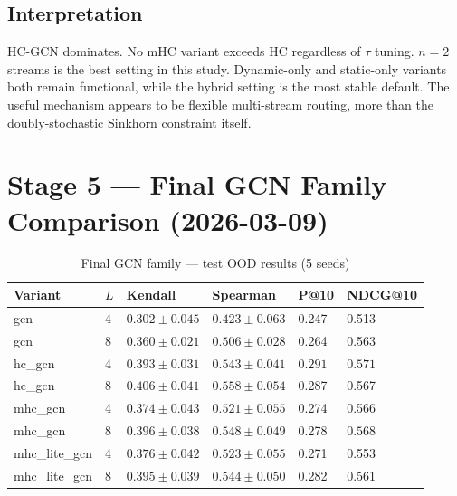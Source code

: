 \documentclass[11pt,a4paper]{article}
\begin{document}
\subsection{Interpretation}
HC-GCN dominates. No mHC variant exceeds HC regardless of $\tau$ tuning.
$n=2$ streams is the best setting in this study. Dynamic-only and
static-only variants both remain functional, while the hybrid setting
is the most stable default. The useful mechanism appears to be flexible
multi-stream routing, more than the doubly-stochastic Sinkhorn
constraint itself.

\section{Stage 5 --- Final GCN Family Comparison (2026-03-09)}

\begin{table}[h]
\centering
\caption{Final GCN family --- test OOD results (5 seeds)}
\begin{tabular}{L{3cm} C{0.8cm} R{2.2cm} R{2.2cm} R{2.2cm} R{2.2cm}}
\toprule
Variant & $L$ & Kendall & Spearman & P@10 & NDCG@10 \\
\midrule
gcn            & 4 & $0.302\pm0.045$ & $0.423\pm0.063$ & 0.247 & 0.513 \\
gcn            & 8 & $0.360\pm0.021$ & $0.506\pm0.028$ & 0.264 & 0.563 \\
\midrule
hc\_gcn        & 4 & $0.393\pm0.031$ & $0.543\pm0.041$ & $\mathbf{0.291}$ & $\mathbf{0.571}$ \\
hc\_gcn        & 8 & $\mathbf{0.406\pm0.041}$ & $\mathbf{0.558\pm0.054}$ & 0.287 & 0.567 \\
\midrule
mhc\_gcn       & 4 & $0.374\pm0.043$ & $0.521\pm0.055$ & 0.274 & 0.566 \\
mhc\_gcn       & 8 & $0.396\pm0.038$ & $0.548\pm0.049$ & 0.278 & $\mathbf{0.568}$ \\
\midrule
mhc\_lite\_gcn & 4 & $0.376\pm0.042$ & $0.523\pm0.055$ & 0.271 & 0.553 \\
mhc\_lite\_gcn & 8 & $0.395\pm0.039$ & $0.544\pm0.050$ & 0.282 & 0.561 \\
\bottomrule
\end{tabular}
\end{table}
\end{document}
